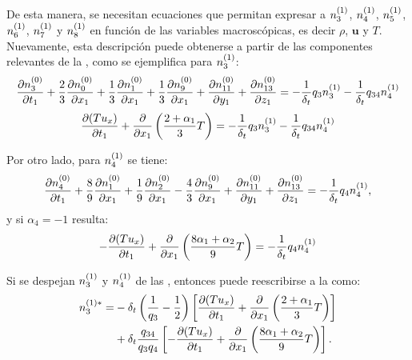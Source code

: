 De esta manera, se necesitan ecuaciones que permitan expresar a $n_{3}^{(1)}$, $n_{4}^{(1)}$, $n_{5}^{(1)}$, $n_{6}^{(1)}$, $n_{7}^{(1)}$ y $n_{8}^{(1)}$ en funci\'on de las variables macrosc\'opicas, es decir $\rho$, $\bm{u}$ y $T$. Nuevamente, esta descripci\'on puede obtenerse a partir de las componentes relevantes de la , como se ejemplifica para $n_{3}^{(1)}$:
\begin{equation}
	\dfrac{\partial n_{3}^{(0)}}{\partial t_1} 
	+ \dfrac{2}{3} \dfrac{\partial n_{0}^{(0)}}{\partial x_1}
	+ \dfrac{1}{3} \dfrac{\partial n_{1}^{(0)}}{\partial x_1}	
	+ \dfrac{1}{3} \dfrac{\partial n_{9}^{(0)}}{\partial x_1}	
	+ \dfrac{\partial n_{11}^{(0)}}{\partial y_1}	
	+ \dfrac{\partial n_{13}^{(0)}}{\partial z_1}	
	= -\dfrac{1}{\delta_t} q_3 n_{3}^{(1)} -\dfrac{1}{\delta_t} q_{34} n_{4}^{(1)}
\end{equation}
\begin{equation}
	\dfrac{\partial (Tu_x)}{\partial t_1} 
	+ \dfrac{\partial}{\partial x_1} \left( \dfrac{2+\alpha_1}{3}T \right)
	= -\dfrac{1}{\delta_t} q_3 n_{3}^{(1)} -\dfrac{1}{\delta_t} q_{34} n_{4}^{(1)}
	\label{eq:n3_eps1_3d}
\end{equation}

Por otro lado, para $n_{4}^{(1)}$ se tiene:
\begin{equation}
	\dfrac{\partial n_{4}^{(0)}}{\partial t_1} 
	+ \dfrac{8}{9} \dfrac{\partial n_{1}^{(0)}}{\partial x_1}
	+ \dfrac{1}{9} \dfrac{\partial n_{2}^{(0)}}{\partial x_1}	
	- \dfrac{4}{3} \dfrac{\partial n_{9}^{(0)}}{\partial x_1}	
	+ \dfrac{\partial n_{11}^{(0)}}{\partial y_1}	
	+ \dfrac{\partial n_{13}^{(0)}}{\partial z_1}	
	= -\dfrac{1}{\delta_t} q_4 n_{4}^{(1)},
\end{equation}
y si $\alpha_4=-1$ resulta:
\begin{equation}
	-\dfrac{\partial (Tu_x)}{\partial t_1} 
	+ \dfrac{\partial}{\partial x_1} \left( \dfrac{8\alpha_1+\alpha_2}{9}T \right)
	=-\dfrac{1}{\delta_t} q_4 n_{4}^{(1)}
	\label{eq:n4_eps1_3d}
\end{equation}

Si se despejan $n_{3}^{(1)}$ y $n_{4}^{(1)}$ de las , entonces puede reescribirse a la  como:
\begin{equation}
	\begin{aligned}
	    n_{3}^{(1)*} = &- \delta_t \left( \dfrac{1}{q_3} - \dfrac{1}{2} \right) \left[ \dfrac{\partial (Tu_x)}{\partial t_1} + \dfrac{\partial}{\partial x_1} \left( \dfrac{2+\alpha_1}{3}T \right) \right] \\
	    &+ \delta_t \dfrac{q_{34}}{q_3 q_4} \left[ -\dfrac{\partial (Tu_x)}{\partial t_1} + \dfrac{\partial}{\partial x_1} \left( \dfrac{8\alpha_1+\alpha_2}{9}T \right) \right].
	\end{aligned}
	\label{eq:n3star_final_3d}
\end{equation}

